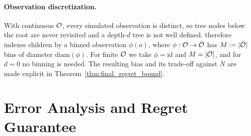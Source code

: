 \paragraph{Observation discretization.}
With continuous ${\mathcal{O}}$, every simulated observation is distinct, so tree nodes below the root are never revisited and a depth-$d$ tree is not well defined.
 therefore indexes children by a binned observation $\phi(o)$, where $\phi:{\mathcal{O}}\to\bar{{\mathcal{O}}}$ has $M:=|\bar{{\mathcal{O}}}|$ bins of diameter $\mathrm{diam}(\phi)$.
For finite ${\mathcal{O}}$ we take $\phi=\mathrm{id}$ and $M=|{\mathcal{O}}|$, and for $d=0$ no binning is needed.
The resulting bias and its trade-off against $N$ are made explicit in Theorem~\ref{thm:final_regret_bound}.


\section{Error Analysis and Regret Guarantee}
\label{sec:analysis}


